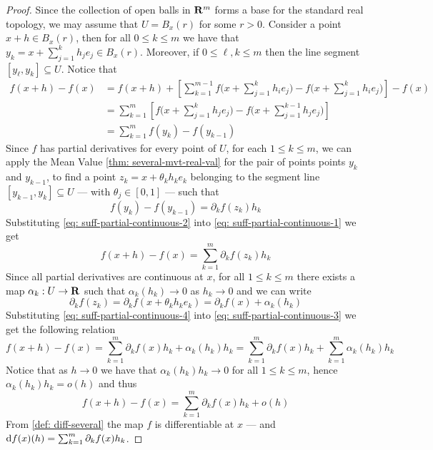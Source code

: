 \begin{proof}
    Since the collection of open balls in \(\mathbf{R}^m\) forms a base for the standard
    real topology, we may assume that \(U = B_x(r)\) for some \(r > 0\). Consider
    a point \(x + h \in B_x(r)\), then for all \(0 \leq k \leq m\) we have that
    \(y_k = x + \sum_{j=1}^k h_j e_j \in B_x(r)\). Moreover, if \(0 \leq \ell, k
    \leq m\) then the line segment \([y_\ell, y_k] \subseteq U\). Notice that
    \begin{align}\label{eq: suff-partial-continuous-1}
        \nonumber
        f(x + h) - f(x)
         & = f(x + h) + \left[ \sum_{k=1}^{m-1}
            f\bigg( x + \sum_{j=1}^k h_i e_j \bigg) -
            f\bigg( x + \sum_{j=1}^k h_i e_j \bigg)
            \right] - f(x)
        \\
        \nonumber
         & = \sum_{k=1}^m \left[
            f\bigg( x + \sum_{j=1}^k h_j e_j \bigg)
            - f\bigg( x + \sum_{j=1}^{k-1} h_j e_j \bigg)
            \right]
        \\
         & = \sum_{k=1}^m f(y_k) - f(y_{k-1})
    \end{align}
    Since \(f\) has partial derivatives for every point of \(U\), for each \(1
    \leq k \leq m\), we can apply the Mean Value \cref{thm: several-mvt-real-val}
    for the pair of points points \(y_k\) and \(y_{k-1}\), to find a point \(z_k =
    x + \theta_k h_k e_k\) belonging to the segment line \([y_{k-1}, y_k]
    \subseteq U\) --- with \(\theta_j \in [0, 1]\) --- such that
    \begin{equation}\label{eq: suff-partial-continuous-2}
        f(y_k) - f(y_{k-1}) = \partial_k f(z_k) h_k
    \end{equation}
    Substituting \cref{eq: suff-partial-continuous-2} into \cref{eq:
        suff-partial-continuous-1} we get
    \begin{equation}\label{eq: suff-partial-continuous-3}
        f(x + h) - f(x)
        = \sum_{k=1}^m \partial_k f(z_k) h_k
    \end{equation}
    Since all partial derivatives are continuous at \(x\), for all \(1 \leq k \leq
    m\) there exists a map \(\alpha_k: U \to \mathbf{R}\) such that \(\alpha_k(h_k) \to
    0\) as \(h_k \to 0\) and we can write
    \begin{equation}\label{eq: suff-partial-continuous-4}
        \partial_k f(z_k) = \partial_k f(x + \theta_k h_k e_k)
        = \partial_k f(x) + \alpha_k(h_k)
    \end{equation}
    Substituting \cref{eq: suff-partial-continuous-4} into \cref{eq:
        suff-partial-continuous-3} we get the following relation
    \[
        f(x + h) - f(x) = \sum_{k=1}^m \partial_k f(x) h_k + \alpha_k(h_k) h_k
        = \sum_{k=1}^m \partial_k f(x) h_k + \sum_{k=1}^m \alpha_k(h_k) h_k
    \]
    Notice that as \(h \to 0\) we have that \(\alpha_k(h_k) h_k \to 0\) for all
    \(1 \leq k \leq m\), hence \(\alpha_k(h_k) h_k = o(h)\) and thus
    \[
        f(x + h) - f(x) = \sum_{k=1}^m \partial_k f(x) h_k + o(h)
    \]
    From \cref{def: diff-several} the map \(f\) is differentiable at \(x\) --- and
    \(\mathrm{d} f(x)(h) = \sum_{k=1}^m \partial_k f(x) h_k\).
\end{proof}

